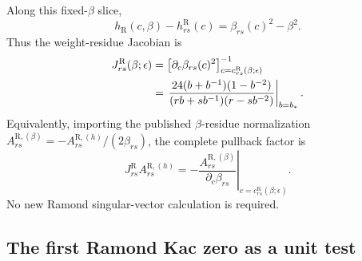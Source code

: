 \documentclass[11pt]{article}
\newcommand{\R}{\mathrm{R}}
\begin{document}
Along this fixed-\(\beta\) slice,
\begin{equation}
 h_{\R}(c,\beta)-h^{\R}_{rs}(c)
 =\beta_{rs}(c)^2-\beta^2.
\end{equation}
Thus the weight-residue Jacobian is
\begin{align}
 J^{\R}_{rs}(\beta;\epsilon)
 &=
 \left[
 \partial_c\beta_{rs}(c)^2
 \right]^{-1}_{c=c^{\R}_{rs}(\beta;\epsilon)}
 \notag\\
 &=
 \left.
 \frac{24(b+b^{-1})(1-b^{-2})}
 {(rb+s b^{-1})(r-s b^{-2})}
 \right|_{b=b_*}.
 \label{eq:r-jacobian}
\end{align}
Equivalently, importing the published \(\beta\)-residue normalization
\(A^{\R,(\beta)}_{rs}=-A^{\R,(h)}_{rs}/(2\beta_{rs})\), the complete
pullback factor is
\begin{equation}
 J^{\R}_{rs}A^{\R,(h)}_{rs}
 =
 -\left.
 \frac{A^{\R,(\beta)}_{rs}}{\partial_c\beta_{rs}}
 \right|_{c=c^{\R}_{rs}(\beta;\epsilon)} .
\end{equation}
No new Ramond singular-vector calculation is required.

\subsection{The first Ramond Kac zero as a unit test}
\label{sec:r-level-one}
\end{document}

